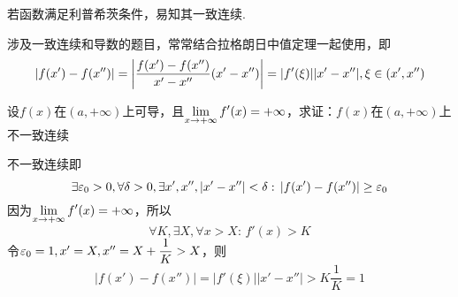 \par 若函数满足利普希茨条件，易知其一致连续.
\par 涉及一致连续和导数的题目，常常结合拉格朗日中值定理一起使用，即
\[|f(x')-f(x'')|=\left|\dfrac{f(x')-f(x'')}{x'-x''}(x'-x'')\right|=|f'(\xi)||x'-x''|,\xi\in(x',x'')\]
\begin{example}
设$f(x)$在$(a,+\infty)$上可导，且$\displaystyle\lim_{x\to+\infty}f'(x)=+\infty$，求证：$f(x)$在$(a,+\infty)$上不一致连续
\end{example}
\begin{analysis}
不一致连续即
\[\exists \varepsilon_0>0,\forall\delta>0,\exists x',x'',|x'-x''|<\delta:\,|f(x')-f(x'')|\geq\varepsilon_0\]
因为$\displaystyle\lim_{x\to+\infty}f'(x)=+\infty$，所以
\[\forall K,\exists X,\forall x>X:\,f'(x)>K\]
令$\varepsilon_0=1,x'=X,x''=X+\dfrac{1}{K}>X$，则
\[|f(x')-f(x'')|=|f'(\xi)||x'-x''|>K\dfrac{1}{K}=1\]
\end{analysis}